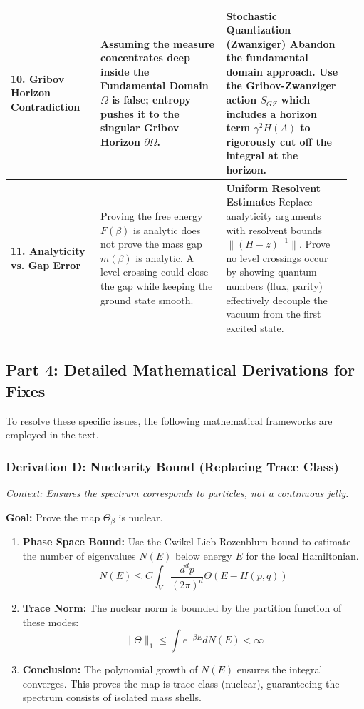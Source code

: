 \begin{center}
\begin{tabular}{|p{0.25\linewidth}|p{0.35\linewidth}|p{0.35\linewidth}|}
\hline
\textbf{10. Gribov Horizon Contradiction} & Assuming the measure concentrates deep inside the Fundamental Domain $\Omega$ is false; entropy pushes it to the singular Gribov Horizon $\partial \Omega$. & \textbf{Stochastic Quantization (Zwanziger)} \newline Abandon the fundamental domain approach. Use the Gribov-Zwanziger action $S_{GZ}$ which includes a horizon term $\gamma^2 H(A)$ to rigorously cut off the integral at the horizon. \\
\hline
\textbf{11. Analyticity vs. Gap Error} & Proving the free energy $F(\beta)$ is analytic does not prove the mass gap $m(\beta)$ is analytic. A level crossing could close the gap while keeping the ground state smooth. & \textbf{Uniform Resolvent Estimates} \newline Replace analyticity arguments with resolvent bounds $\|(H-z)^{-1}\|$. Prove no level crossings occur by showing quantum numbers (flux, parity) effectively decouple the vacuum from the first excited state. \\
\hline
\end{tabular}
\end{center}

\subsection{Part 4: Detailed Mathematical Derivations for Fixes}

To resolve these specific issues, the following mathematical frameworks are employed in the text.

\subsubsection{Derivation D: Nuclearity Bound (Replacing Trace Class)}

\textit{Context: Ensures the spectrum corresponds to particles, not a continuous jelly.}

\textbf{Goal:} Prove the map $\Theta_{\beta}$ is nuclear.

\begin{enumerate}
    \item \textbf{Phase Space Bound:} Use the Cwikel-Lieb-Rozenblum bound to estimate the number of eigenvalues $N(E)$ below energy $E$ for the local Hamiltonian.
    $$ N(E) \le C \int_{V} \frac{d^d p}{(2\pi)^d} \Theta(E - H(p,q)) $$
    \item \textbf{Trace Norm:} The nuclear norm is bounded by the partition function of these modes:
    $$ \|\Theta\|_1 \le \int e^{-\beta E} dN(E) < \infty $$
    \item \textbf{Conclusion:} The polynomial growth of $N(E)$ ensures the integral converges. This proves the map is trace-class (nuclear), guaranteeing the spectrum consists of isolated mass shells.
\end{enumerate}

